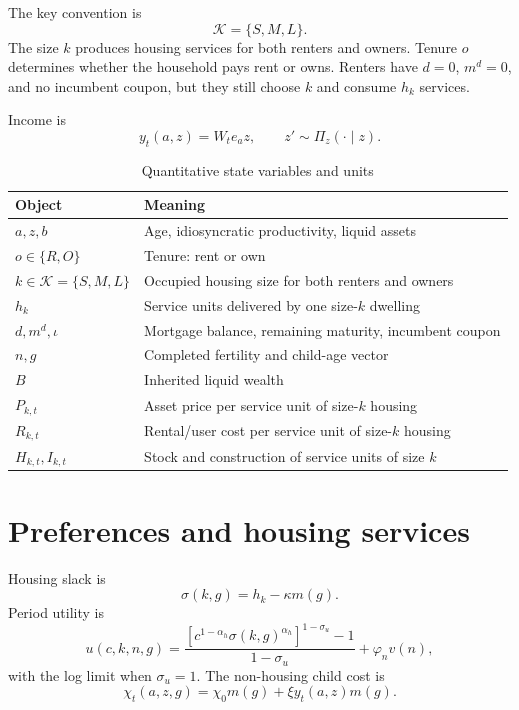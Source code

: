 \documentclass[11pt]{article}
\newcommand{\1}{\mathbf 1}
\newcommand{\KK}{\mathcal K}
\begin{document}
The key convention is
\begin{equation}
\KK=\{S,M,L\}.
\end{equation}
The size $k$ produces housing services for both renters and owners. Tenure $o$ determines whether the household pays rent or owns. Renters have $d=0$, $m^d=0$, and no incumbent coupon, but they still choose $k$ and consume $h_k$ services.

Income is
\begin{equation}
y_t(a,z)=W_t e_a z,
\qquad z'\sim\Pi_z(\cdot\mid z).
\label{eq:income_quant}
\end{equation}

\begin{table}[H]
\centering
\caption{Quantitative state variables and units}
\small
\begin{tabularx}{\textwidth}{@{}lX@{}}
\toprule
Object & Meaning \\
\midrule
$a,z,b$ & Age, idiosyncratic productivity, liquid assets \\
$o\in\{R,O\}$ & Tenure: rent or own \\
$k\in\KK=\{S,M,L\}$ & Occupied housing size for both renters and owners \\
$h_k$ & Service units delivered by one size-$k$ dwelling \\
$d,m^d,\iota$ & Mortgage balance, remaining maturity, incumbent coupon \\
$n,g$ & Completed fertility and child-age vector \\
$B$ & Inherited liquid wealth \\
$P_{k,t}$ & Asset price per service unit of size-$k$ housing \\
$R_{k,t}$ & Rental/user cost per service unit of size-$k$ housing \\
$H_{k,t},I_{k,t}$ & Stock and construction of service units of size $k$ \\
\bottomrule
\end{tabularx}
\end{table}

\section{Preferences and housing services}

Housing slack is
\begin{equation}
\sigma(k,g)=h_k-\kappa m(g).
\end{equation}
Period utility is
\begin{equation}
u(c,k,n,g)=\frac{\left[c^{1-\alpha_h}\sigma(k,g)^{\alpha_h}\right]^{1-\sigma_u}-1}{1-\sigma_u}+\varphi_n v(n),
\label{eq:period_utility_quant}
\end{equation}
with the log limit when $\sigma_u=1$. The non-housing child cost is
\begin{equation}
\chi_t(a,z,g)=\chi_0m(g)+\xi y_t(a,z)m(g).
\label{eq:child_cost_quant}
\end{equation}
\end{document}
